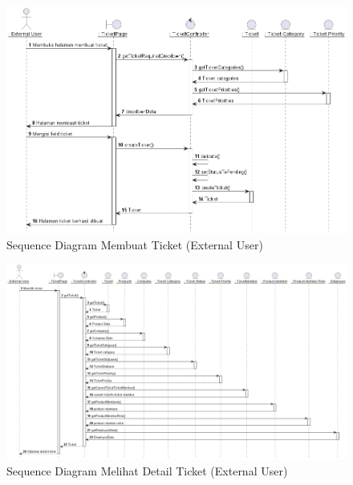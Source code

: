 \documentclass[12pt]{article}
\begin{document}
\begin{enumerate}[label=\textbf{4.\arabic*.}]
\begin{enumerate}[label=\textbf{4.1.\arabic*.}, wide, labelwidth=!, labelindent=0pt]
\begin{enumerate}[label=\textbf{4.1.7.\arabic*.}, wide, labelwidth=!, labelindent=0pt]
\begin{enumerate}[label=\arabic*.]
                \begin{figure}
                    \centering \includegraphics[height=0.575\textheight]{out/plantuml/sequence/ex/ex3/Membuat Ticket.png}
                    \caption{Sequence Diagram Membuat Ticket (External User)}
                    \label{fig:SQ-PIC-03}
                \end{figure}

                \begin{figure}
                    \centering \includegraphics[height=0.575\textheight]{out/plantuml/sequence/ex/ex4/Melihat Detail Ticket.png}
                    \caption{Sequence Diagram Melihat Detail Ticket (External User)}
                    \label{fig:SQ-PIC-04}
                \end{figure}


\end{enumerate}
\end{enumerate}
\end{enumerate}
\end{enumerate}
\end{document}
